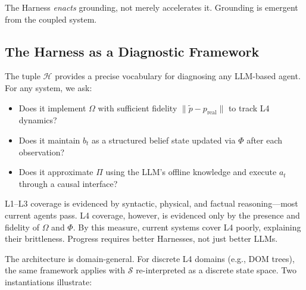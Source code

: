 The Harness \emph{enacts} grounding, not merely accelerates it. Grounding is emergent from the coupled system.

\subsection{The Harness as a Diagnostic Framework}

The tuple \(\mathcal{H}\) provides a precise vocabulary for diagnosing any LLM-based agent. For any system, we ask:

\begin{itemize}
\item Does it implement \(\Omega\) with sufficient fidelity \(\| \tilde{p} - p_{\text{real}} \|\) to track L4 dynamics?

\item Does it maintain \(b_t\) as a structured belief state updated via \(\Phi\) after each observation?

\item Does it approximate \(\Pi\) using the LLM's offline knowledge and execute \(a_t\) through a causal interface?
\end{itemize}

L1--L3 coverage is evidenced by syntactic, physical, and factual reasoning---most current agents pass. L4 coverage, however, is evidenced only by the presence and fidelity of \(\Omega\) and \(\Phi\). By this measure, current systems cover L4 poorly, explaining their brittleness. Progress requires better Harnesses, not just better LLMs.

The architecture is domain-general. For discrete L4 domains (e.g., DOM trees), the same framework applies with \(\mathcal{S}\) re-interpreted as a discrete state space. Two instantiations illustrate:

